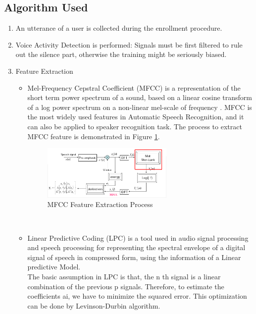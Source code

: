 \documentclass[conference]{IEEEtran}
\begin{document}
\subsection{Algorithm Used}
\begin{enumerate}
  \item An utterance of a user is collected during the enrollment procedure.
  \item Voice Activity Detection is performed: Signals must be first filtered to rule out the silence part, otherwise the training might be seriously biased.
  \item Feature Extraction
    \begin{itemize}
      \item Mel-Frequency Cepstral Coefficient (MFCC) is a representation of the short term power spectrum of a sound, based on a linear cosine transform of a log power spectrum on a non-linear mel-scale of frequency . MFCC is the most widely used features in Automatic Speech Recognition, and it can also be applied to speaker recognition task. The process to extract MFCC feature is demonstrated in Figure \ref{fig:MFCC_fig_one}. \\
      \begin{figure}[!t]
      \centering
      \includegraphics[width=2.5in]{./MFCC-mel-filterbank.png}
      \caption{MFCC Feature Extraction Process}
      \label{fig:MFCC_fig_one}
      \end{figure}
      \\
      \item Linear Predictive Coding (LPC) is a tool used in audio signal processing and speech processing for representing the spectral envelope of a digital signal of speech in compressed form, using the information of a Linear predictive Model. \\
      The basic assumption in LPC is that, the n th signal is a linear combination of the previous p signals. Therefore, to estimate the coefficients ai, we have to minimize the squared error. This optimization can be done by Levinson-Durbin algorithm.

\end{itemize}
\end{enumerate}
\end{document}
